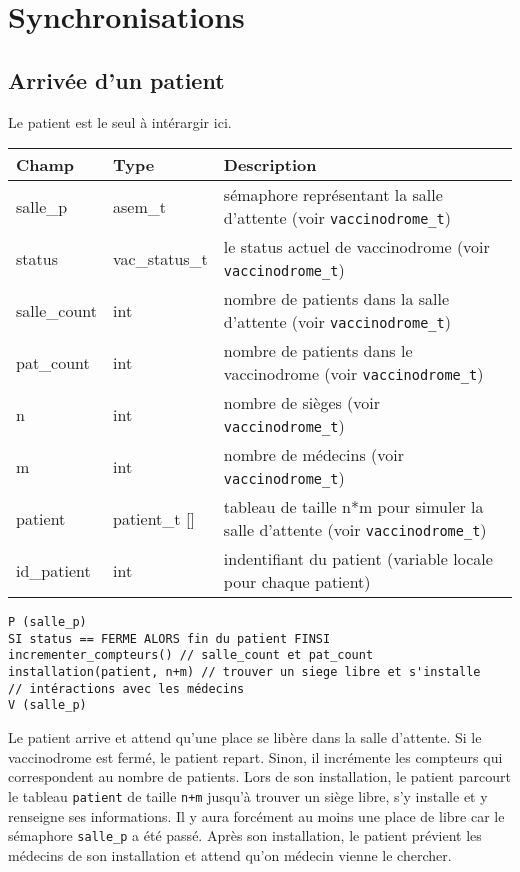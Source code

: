 \documentclass[a4paper]{article}
\begin{document}
\newpage 

\section{Synchronisations}

\subsection{Arrivée d'un patient}\label{arrivee-patient}

Le patient est le seul à intérargir ici.
\bigskip \newline
\begin{tabularx}{\linewidth}{|l|l|>{\strut}X|}
  \hline%
  Champ & Type & Description \\ \hline%
  salle\_p & asem\_t & sémaphore représentant la salle d'attente (voir \texttt{vaccinodrome\_t}) \\ \hline%
  status & vac\_status\_t & le status actuel de vaccinodrome (voir \texttt{vaccinodrome\_t}) \\ \hline%
  salle\_count & int & nombre de patients dans la salle d'attente (voir \texttt{vaccinodrome\_t}) \\ \hline%
  pat\_count & int & nombre de patients dans le vaccinodrome (voir \texttt{vaccinodrome\_t}) \\ \hline%
  n & int & nombre de sièges (voir \texttt{vaccinodrome\_t}) \\ \hline%
  m & int & nombre de médecins (voir \texttt{vaccinodrome\_t}) \\ \hline%
  patient & patient\_t [] & tableau de taille n*m pour simuler la salle d'attente (voir \texttt{vaccinodrome\_t})\\ \hline%
  id\_patient & int & indentifiant du patient (variable locale pour chaque patient) \\ \hline%
\end{tabularx}

\begin{verbatim}
P (salle_p)
SI status == FERME ALORS fin du patient FINSI
incrementer_compteurs() // salle_count et pat_count
installation(patient, n+m) // trouver un siege libre et s'installe
// intéractions avec les médecins
V (salle_p)
\end{verbatim}

    Le patient arrive et attend qu'une place se libère dans la salle d'attente. Si le vaccinodrome est fermé, le patient repart. Sinon, il incrémente les compteurs qui correspondent au nombre de patients.
    Lors de son installation, le patient parcourt le tableau \texttt{patient} de taille \texttt{n+m} jusqu'à trouver un siège libre, s'y installe et y renseigne ses informations. Il y aura forcément au moins une place de libre car le sémaphore \texttt{salle\_p} a été passé.
    Après son installation, le patient prévient les médecins de son installation et attend qu'on médecin vienne le chercher.
    
\end{document}
